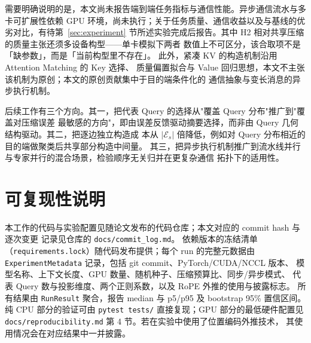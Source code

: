需要明确说明的是，本文尚未报告端到端任务指标与通信性能。异步通信流水与多卡可扩展性依赖
GPU 环境，尚未执行；关于任务质量、通信收益以及与基线的优劣对比，有待第~\ref{sec:experiment}
节所述实验完成后报告。其中 H2 相对共享压缩的质量主张还须多设备构型——单卡模拟下两者
数值上不可区分，该合取项不是「缺参数」，而是「当前构型里不存在」。
此外，紧凑 KV 的构造机制沿用 Attention Matching 的 Key 选择、
质量偏置拟合与 Value 回归思想，本文不主张该机制为原创；本文的原创贡献集中于目的端条件化的
通信抽象与变长消息的异步执行机制。

后续工作有三个方向。其一，把代表 Query 的选择从"覆盖 Query 分布"推广到"覆盖对压缩误差
最敏感的方向"，即由误差反馈驱动摘要选择，而非由 Query 几何结构驱动。其二，把逐边独立构造成
本从 $|\mathcal{E}_s|$ 倍降低，例如对 Query 分布相近的目的端做聚类后共享部分构造中间量。
其三，把异步执行机制推广到流水线并行与专家并行的混合场景，检验顺序无关归并在更复杂通信
拓扑下的适用性。

\section*{可复现性说明}

本工作的代码与实验配置见随论文发布的代码仓库；本文对应的 commit hash 与逐次变更
记录见仓库的 \texttt{docs/}\allowbreak\texttt{commit\_}\allowbreak\texttt{log.md}。
依赖版本的冻结清单（\texttt{requirements.lock}）随代码发布提供；每个 run 的完整元数据由
\texttt{ExperimentMetadata} 记录，包括 git commit、PyTorch/CUDA/NCCL 版本、
模型名称、上下文长度、GPU 数量、随机种子、压缩预算比、同步/异步模式、
代表 Query 数与投影维度、两个正则系数，以及 RoPE 外推的使用与披露标志。
所有结果由 \texttt{RunResult} 聚合，报告 median 与 p5/p95 及 bootstrap 95\% 置信区间。
纯 CPU 部分的验证可由 \texttt{pytest tests/} 直接复现；GPU 部分的最低硬件配置见
\texttt{docs/reproducibility.md} 第 4 节。若在实验中使用了位置编码外推技术，
其使用情况会在对应结果中一并披露。
